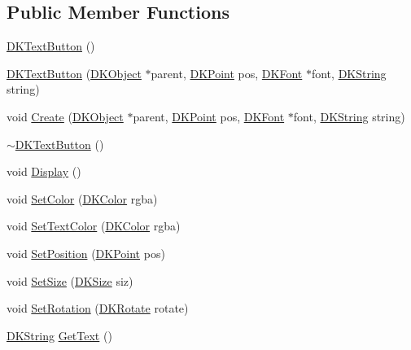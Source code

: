 \subsection*{Public Member Functions}
\begin{DoxyCompactItemize}
\item 
\hyperlink{class_d_k_text_button_a506a5dab3add0e942a7a49d197b7a9fd}{D\-K\-Text\-Button} ()
\item 
\hyperlink{class_d_k_text_button_acf46446d791b8663dbab07c6f4daf091}{D\-K\-Text\-Button} (\hyperlink{class_d_k_object}{D\-K\-Object} $\ast$parent, \hyperlink{_d_k_axis_8h_a0ca1f005fbb936f8e7a7f2433591f418}{D\-K\-Point} pos, \hyperlink{class_d_k_font}{D\-K\-Font} $\ast$font, \hyperlink{_d_k_string_8h_ac168e8555ceba18e1a2919b21976bc84}{D\-K\-String} string)
\item 
void \hyperlink{class_d_k_text_button_aab4a2f93e5065f48652c02d9cdd89256}{Create} (\hyperlink{class_d_k_object}{D\-K\-Object} $\ast$parent, \hyperlink{_d_k_axis_8h_a0ca1f005fbb936f8e7a7f2433591f418}{D\-K\-Point} pos, \hyperlink{class_d_k_font}{D\-K\-Font} $\ast$font, \hyperlink{_d_k_string_8h_ac168e8555ceba18e1a2919b21976bc84}{D\-K\-String} string)
\item 
\hyperlink{class_d_k_text_button_ab741af3589f12241652a11ccddc851b7}{$\sim$\-D\-K\-Text\-Button} ()
\item 
void \hyperlink{class_d_k_text_button_a060a07f5aee897f21e37661db1431dbe}{Display} ()
\item 
void \hyperlink{class_d_k_text_button_ab4fd41992a22bce8a372e6534769d870}{Set\-Color} (\hyperlink{class_d_k_color}{D\-K\-Color} rgba)
\item 
void \hyperlink{class_d_k_text_button_a22754e2a9821c4090b50fe90d2f325b4}{Set\-Text\-Color} (\hyperlink{class_d_k_color}{D\-K\-Color} rgba)
\item 
void \hyperlink{class_d_k_text_button_acaf5de9613bd0cf480894d52e0b729f6}{Set\-Position} (\hyperlink{_d_k_axis_8h_a0ca1f005fbb936f8e7a7f2433591f418}{D\-K\-Point} pos)
\item 
void \hyperlink{class_d_k_text_button_aca9a52252b43c05cc52c9f0304ec6e35}{Set\-Size} (\hyperlink{_d_k_axis_8h_aaa25a8c7cbf504fffdb8a4208ff7a731}{D\-K\-Size} siz)
\item 
void \hyperlink{class_d_k_text_button_a7bbe255f1f2a0367de8a07d81be9d117}{Set\-Rotation} (\hyperlink{_d_k_axis_8h_a886498401ce03ee3a95cb58785ab475a}{D\-K\-Rotate} rotate)
\item 
\hyperlink{_d_k_string_8h_ac168e8555ceba18e1a2919b21976bc84}{D\-K\-String} \hyperlink{class_d_k_text_button_abf463c91528d805636bb50cdbc84d892}{Get\-Text} ()

\end{DoxyCompactItemize}
